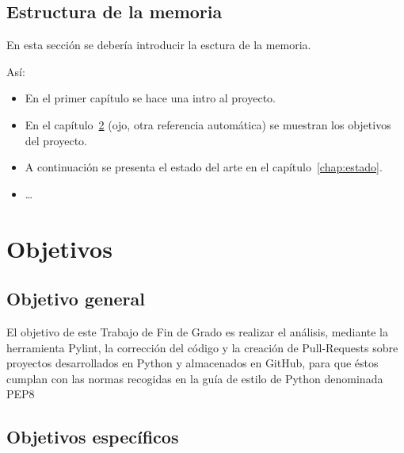 \documentclass[a4paper, 12pt]{book}
\begin{document}
\section{Estructura de la memoria}
\label{sec:estructura}
En esta sección se debería introducir la esctura de la memoria. 

Así:

\begin{itemize}
  \item En el primer capítulo se hace una intro al proyecto.
  
  \item En el capítulo~\ref{chap:objetivos} (ojo, otra referencia automática) se muestran los objetivos del proyecto.
  
  \item A continuación se presenta el estado del arte en el capítulo~\ref{chap:estado}.
  
  \item \ldots
\end{itemize}




\cleardoublepage %
\chapter{Objetivos} %
\label{chap:objetivos} %

\section{Objetivo general} %
\label{sec:objetivo-general} %

El objetivo de este Trabajo de Fin de Grado es realizar el análisis, mediante la herramienta Pylint, la corrección del código y la creación de Pull-Requests sobre proyectos desarrollados en Python y almacenados en GitHub, para que éstos cumplan con las normas recogidas en la guía de estilo de Python denominada PEP8

\section{Objetivos específicos}
\label{sec:objetivos-especificos}
\end{document}

